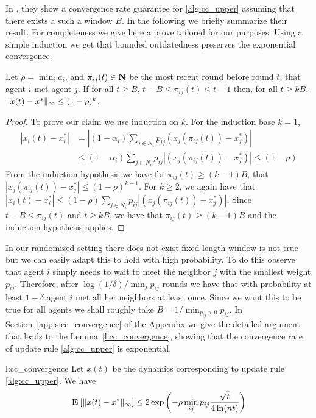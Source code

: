 In \cite{BT97}, they show a convergence rate guarantee for
\ref{alg:cc_upper} assuming that there exists a such a window $B$.
In the  following we briefly summarize their result.  For completeness we
give here a prove tailored for our purposes.
Using a simple induction we get that bounded outdatedness
preserves the exponential convergence.
\begin{lemma}\label{l:outdatedness_induction}
  Let $\rho = \min_i a_i$, and $\pi_{ij}(t) \in \bm{\mathrm{N}}$ be the most recent round
  before round $t$, that agent $i$ met agent $j$.
  If for all $t\geq B$, $t-B \leq \pi_{ij}(t) \leq t-1$ then, for
  all $t \geq k B$,
  \(\| x(t) - x^* \|_{\infty} \leq (1-\rho)^k\).
\end{lemma}
\begin{proof}
  To prove our claim we use induction on $k$. For the induction base $k=1$,
  \begin{align*}
    |x_i(t) - x_i^*|
    &=
    |(1-\alpha_i)\sum_{j \in N_i}p_{ij}(x_j(\pi_{ij}(t)) -x_j^*)|\\
    &\leq
    (1-\alpha_i)\sum_{j \in N_i}p_{ij}|(x_j(\pi_{ij}(t))-x_j^*)|\leq (1-\rho)
  \end{align*}
  From the induction hypothesis we have for $\pi_{ij}(t) \geq (k-1)B$,
  that $|x_j(\pi_{ij}(t))-x_j^*| \leq (1-\rho)^{k-1}$.
  For $k\geq 2$, we again have that
  $|x_i(t) - x_i^*|\leq (1-\rho)\sum_{j \in N_i}p_{ij}|(x_j(\pi_{ij}(t))-x_j^*)|$.
  Since $t-B \leq \pi_{ij}(t)$ and $t\geq kB$, we have
  that $\pi_{ij}(t) \geq (k-1)B$ and the induction hypothesis applies.
\end{proof}

In our randomized setting there does not exist fixed length window is
not true but we can easily adapt this to hold with high probability.
To do this observe that agent $i$ simply needs to wait to meet the neighbor
$j$ with the smallest weight $p_{ij}$. Therefore, after
$\log(1/\delta)/\min_{j} p_{ij}$ rounds we have that with probability at least
$1-\delta$ agent $i$ met all her neighbors at least once.
Since we want this to be true for all agents
we shall roughly take $B = 1/\min_{p_{ij} > 0} {p_{ij}}$.
In Section~\ref{app:s:cc_convergence} of the Appendix we give the detailed
argument that leads to the Lemma~\ref{l:cc_convergence},
showing that the convergence rate of update rule \ref{alg:cc_upper} is exponential.

\begin{replemma}{l:cc_convergence}
  Let $x(t)$ be the dynamics corresponding
  to update rule \ref{alg:cc_upper}.
  We have
  \[
    \Exp{\norm{\infty}{x(t) - x^*}}
    \leq
    2\exp \lp(- \rho  \min_{ij} p_{ij} \frac{\sqrt{t}}{4\ln(nt)} \rp)
  \]
\end{replemma}
